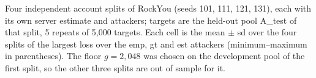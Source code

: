 Four independent account splits of RockYou (seeds 101, 111, 121, 131), each with its own server estimate and attackers; targets are the held-out pool A\_test of that split, 5 repeats of 5,000 targets. Each cell is the mean $\pm$ sd over the four splits of the largest loss over the emp, gt and est attackers (minimum--maximum in parentheses). The floor $g=2{,}048$ was chosen on the development pool of the first split, so the other three splits are out of sample for it.
